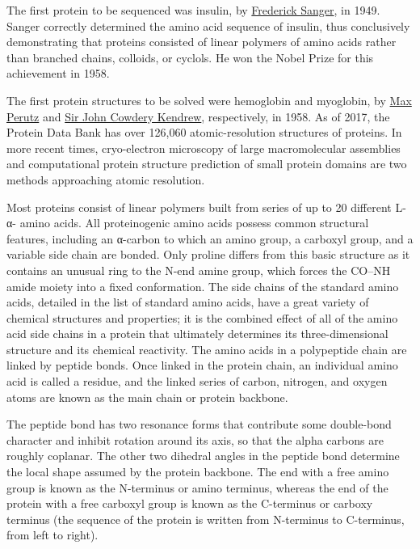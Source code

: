 The first protein to be sequenced was insulin, by
\href{https://en.wikipedia.org/wiki/Frederick_Sanger}{Frederick Sanger},
in 1949. Sanger correctly determined the amino acid sequence of insulin,
thus conclusively demonstrating that proteins consisted of linear
polymers of amino acids rather than branched chains, colloids, or
cyclols. He won the Nobel Prize for this achievement in 1958.

The first protein structures to be solved were hemoglobin and myoglobin,
by \href{https://en.wikipedia.org/wiki/Max_Perutz}{Max Perutz} and
\href{https://en.wikipedia.org/wiki/John_Kendrew}{Sir John Cowdery
Kendrew}, respectively, in 1958. As of 2017, the Protein Data Bank has
over 126,060 atomic-resolution structures of proteins. In more recent
times, cryo-electron microscopy of large macromolecular assemblies and
computational protein structure prediction of small protein domains are
two methods approaching atomic resolution.

Most proteins consist of linear polymers built from series of up to 20
different L-α- amino acids. All proteinogenic amino acids possess common
structural features, including an α-carbon to which an amino group, a
carboxyl group, and a variable side chain are bonded. Only proline
differs from this basic structure as it contains an unusual ring to the
N-end amine group, which forces the CO--NH amide moiety into a fixed
conformation. The side chains of the standard amino acids, detailed in
the list of standard amino acids, have a great variety of chemical
structures and properties; it is the combined effect of all of the amino
acid side chains in a protein that ultimately determines its
three-dimensional structure and its chemical reactivity. The amino acids
in a polypeptide chain are linked by peptide bonds. Once linked in the
protein chain, an individual amino acid is called a residue, and the
linked series of carbon, nitrogen, and oxygen atoms are known as the
main chain or protein backbone.

The peptide bond has two resonance forms that contribute some
double-bond character and inhibit rotation around its axis, so that the
alpha carbons are roughly coplanar. The other two dihedral angles in the
peptide bond determine the local shape assumed by the protein backbone.
The end with a free amino group is known as the N-terminus or amino
terminus, whereas the end of the protein with a free carboxyl group is
known as the C-terminus or carboxy terminus (the sequence of the protein
is written from N-terminus to C-terminus, from left to right).

